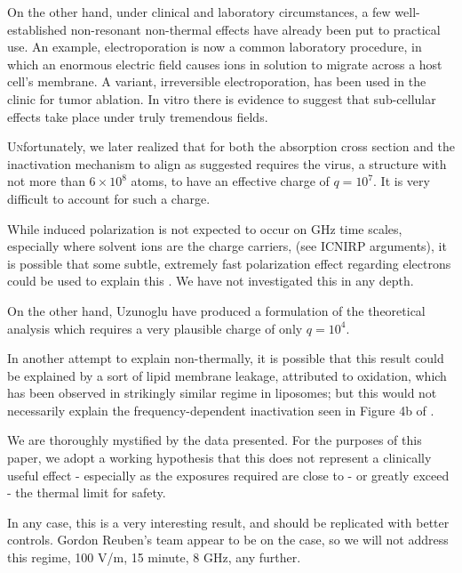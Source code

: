 \documentclass[paper.tex]{subfiles}
\begin{document}
\begin{multicols}{1}
On the other hand, under clinical and laboratory circumstances, a few well-established non-resonant non-thermal effects have already been put to practical use. An example, electroporation is now a common laboratory procedure, in which an enormous electric field causes ions in solution to migrate across a host cell's membrane. A variant, irreversible electroporation, has been used in the clinic for tumor ablation. In vitro there is evidence to suggest that sub-cellular effects take place under truly tremendous fields. 


\lettrine{U}nfortunately, we later realized that for both the absorption cross section and the inactivation mechanism to align as suggested requires the virus, a structure with not more than $6 \times 10^8$ atoms, to have an effective charge of $q=10^7$. It is very difficult to account for such a charge.




While induced polarization is not expected to occur on GHz time scales, especially where solvent ions are the charge carriers, (see ICNIRP arguments), it is possible that some subtle, extremely fast polarization effect regarding electrons could be used to explain this \cite{nature1986}. We have not investigated this in any depth.

On the other hand, Uzunoglu have produced a formulation of the theoretical analysis which requires a very plausible charge of only $q=10^4$. 

In another attempt to explain non-thermally, it is possible that this result could be explained by a sort of lipid membrane leakage, attributed to oxidation, which has been observed in strikingly similar regime in liposomes; but this would not necessarily explain the frequency-dependent inactivation seen in Figure 4b of \cite{Efficient2015}.

We are thoroughly mystified by the data presented. For the purposes of this paper, we adopt a working hypothesis that this does not represent a clinically useful effect - especially as the exposures required are close to - or greatly exceed - the thermal limit for safety.

In any case, this is a very interesting result, and should be replicated with better controls. Gordon Reuben's team appear to be on the case, so we will not address this regime, 100 V/m, 15 minute, 8 GHz, any further.


\end{multicols}
\end{document}
